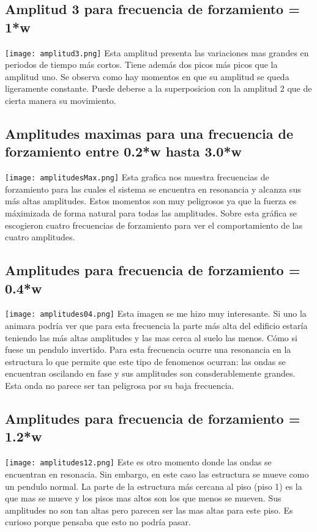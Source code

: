 \documentclass[11pt,letterpaper]{exam}
\begin{document}
\subsection{ Amplitud 3 para frecuencia de forzamiento = 1*w}
\texttt{[image: amplitud3.png]}
Esta amplitud presenta las variaciones mas grandes en periodos de tiempo más cortos. Tiene además dos picos más picos que la amplitud uno. Se observa como hay momentos en que su amplitud se queda ligeramente constante. Puede deberse a la superposicion con la amplitud 2 que de cierta manera su movimiento.


\subsection{ Amplitudes maximas para una frecuencia de forzamiento entre 0.2*w hasta 3.0*w}
\texttt{[image: amplitudesMax.png]}
Esta grafica nos muestra frecuencias de forzamiento para las cuales el sistema se encuentra en resonancia y alcanza sus más altas amplitudes. Estos momentos son muy peligrosos ya que la fuerza es máximizada de forma natural para todas las amplitudes. Sobre esta gráfica se escogieron cuatro frecuencias de forzamiento para ver el comportamiento de las cuatro amplitudes.


\subsection{ Amplitudes para frecuencia de forzamiento = 0.4*w}
\texttt{[image: amplitudes04.png]}
Esta imagen se me hizo muy interesante. Si uno la animara podría ver que para esta frecuencia la parte más alta del edificio estaría teniendo las más altas amplitudes y las mas cerca al suelo las menos. Cómo si fuese un pendulo invertido. Para esta frecuencia ocurre una resonancia en la estructura lo que permite que este tipo de fenomenos ocurran: las ondas se encuentran oscilando en fase y sus amplitudes son consderablemente grandes. Esta onda no parece ser tan peligrosa por su baja frecuencia.

\subsection{ Amplitudes para frecuencia de forzamiento = 1.2*w}
\texttt{[image: amplitudes12.png]}
Este es otro momento donde las ondas se encuentran en resonacia. Sin embargo, en este caso las estructura se mueve como un pendulo normal. La parte de la estructura más cercana al piso (piso 1) es la que mas se mueve y los pisos mas altos son los que menos se mueven. Sus amplitudes no son tan altas pero parecen ser las mas altas para este piso. Es curioso porque pensaba que esto no podría pasar.
\end{document}
